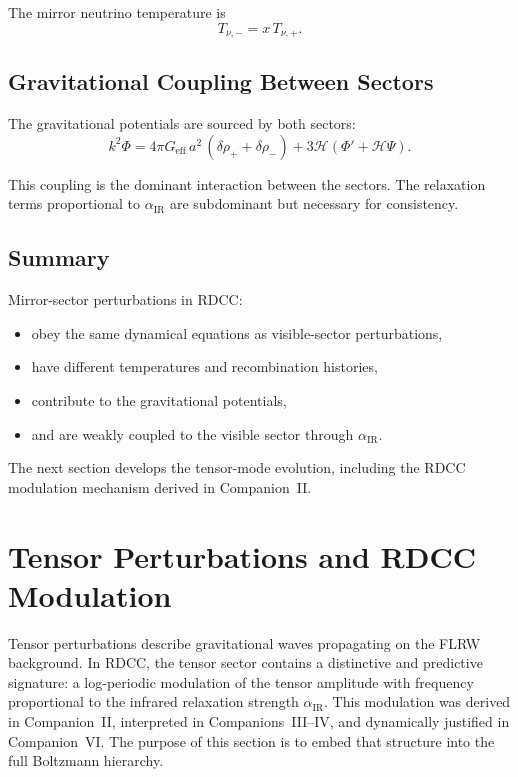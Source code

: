 \documentclass[11pt,a4paper]{article}
\begin{document}
The mirror neutrino temperature is
\begin{equation}
    T_{\nu,-} = x\,T_{\nu,+}.
\end{equation}

\subsection{Gravitational Coupling Between Sectors}

The gravitational potentials are sourced by both sectors:
\begin{equation}
    k^{2}\Phi
    = 4\pi G_{\mathrm{eff}}\,a^{2}\,(\delta\rho_{+} + \delta\rho_{-})
      + 3\mathcal{H}(\Phi' + \mathcal{H}\Psi).
\end{equation}

This coupling is the dominant interaction between the sectors. The relaxation terms
proportional to $\alpha_{\mathrm{IR}}$ are subdominant but necessary for consistency.

\subsection{Summary}

Mirror-sector perturbations in RDCC:
\begin{itemize}
    \item obey the same dynamical equations as visible-sector perturbations,
    \item have different temperatures and recombination histories,
    \item contribute to the gravitational potentials,
    \item and are weakly coupled to the visible sector through $\alpha_{\mathrm{IR}}$.
\end{itemize}

The next section develops the tensor-mode evolution, including the RDCC modulation
mechanism derived in Companion~II.

\section{Tensor Perturbations and RDCC Modulation}

Tensor perturbations describe gravitational waves propagating on the FLRW background.
In RDCC, the tensor sector contains a distinctive and predictive signature: a log-periodic
modulation of the tensor amplitude with frequency proportional to the infrared relaxation
strength $\alpha_{\mathrm{IR}}$. This modulation was derived in Companion~II, interpreted in
Companions~III–IV, and dynamically justified in Companion~VI. The purpose of this section
is to embed that structure into the full Boltzmann hierarchy.
\end{document}
